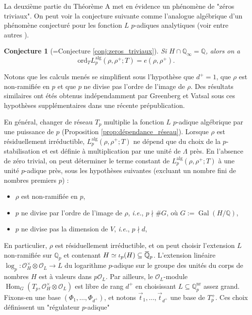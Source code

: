 \documentclass[12pt]{amsart}
\newcommand\bQ{\mathbb{Q}}
\newcommand\Qp{\mathbb{Q}_{p}}
\newcommand\cO{\mathcal{O}}
\newcommand{\ob}[1]{\mkern 1.5mu\overline{\mkern-1.5mu#1\mkern-1.5mu}\mkern 1.5mu}
\newcommand{\ord}{\mathrm{ord}}
\newcommand{\alg}{\textrm{alg}}
\DeclareMathOperator{\Gal}{Gal}
\DeclareMathOperator{\Hom}{Hom}
\theoremstyle{defstyle}
\theoremstyle{thmstyle}
\newtheorem*{conjecture*}{Conjecture}
\begin{document}
La deuxième partie du Théorème A met en évidence un phénomène de "zéros triviaux". On peut voir la conjecture suivante comme l'analogue algébrique d'un phénomène conjecturé pour les fonction $L$ $p$-adiques analytiques (voir entre autres \cite{gross1981padic,benois}). 

\begin{conjecture*}[=Conjecture \ref{conj:zeros_triviaux}]
	Si $H\cap \bQ_\infty =\bQ$, alors on a 
	$$\ord_{T} L_p^{\alg}(\rho,\rho^+;T) = e(\rho,\rho^+).$$
\end{conjecture*}

Notons que les calculs menés se simplifient sous l'hypothèse que $d^+=1$, que $\rho$ est non-ramifiée en $p$ et que $p$ ne divise pas l'ordre de l'image de $\rho$. Des résultats similaires ont étés obtenus indépendamment par Greenberg et Vatsal \cite{preprint} sous ces hypothèses supplémentaires dans une récente prépublication. 

En général, changer de réseau $T_p$ multiplie la fonction $L$ $p$-adique algébrique par une puissance de $p$ (Proposition \ref{prop:dépendance_réseau}). Lorsque $\rho$ est résiduellement irréductible, $L_p^{\alg}(\rho,\rho^+;T)$ ne dépend que du choix de la $p$-stabilisation et est définie à multiplication par une unité de $\Lambda$ près. En l'absence de zéro trivial, on peut déterminer le terme constant de $L_p^{\alg}(\rho,\rho^+;T)$ à une unité $p$-adique près, sous les hypothèses suivantes (excluant un nombre fini de nombres premiers $p$) : 
\begin{itemize}
	\item[\textbf{(nr)}] $\rho$ est non-ramifiée en $p$,
	\item[\textbf{(deg)}] $p$ ne divise par l'ordre de l'image de $\rho$, \textit{i.e.}, $p\nmid \#G$, où $G:=\Gal(H/\bQ)$,
	\item[\textbf{(dim)}] $p$ ne divise pas la dimension de $V$, \textit{i.e.}, $p\nmid d$,
\end{itemize}
En particulier, $\rho$ est résiduellement irréductible, et on peut choisir l'extension $L$ non-ramifiée sur $\Qp$ et contenant $H\simeq \iota_p(H)\subseteq \ob{\bQ}_p$. L'extension linéaire  $\log_p : \cO_H^\times \otimes \cO_L \longrightarrow L$ du logarithme $p$-adique sur le groupe des unités du corps de nombres $H$ est à valeurs dans $p\cO_L$. Par ailleurs, le $\cO_L$-module $\Hom_G(T_p,\cO_H^\times \otimes \cO_L)$ est libre de rang $d^+$ en choisissant $L\subseteq \bQ_p^{\textrm{nr}}$ assez grand. Fixons-en une base $(\Phi_1,\ldots,\Phi_{d^+})$, et notons $\vec{t}_1,\ldots,\vec{t}_{d^+}$ une base de $T^+_p$. Ces choix définissent un "régulateur $p$-adique"
\end{document}
